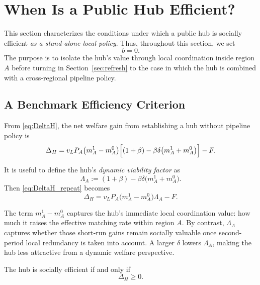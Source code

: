 \section{When Is a Public Hub Efficient?}
\label{sec:hub_efficiency}

This section characterizes the conditions under which a public hub is socially efficient \emph{as a stand-alone local policy}. Thus, throughout this section, we set
\[
b=0.
\]
The purpose is to isolate the hub's value through local coordination inside region $A$ before turning in Section~\ref{sec:refresh} to the case in which the hub is combined with a cross-regional pipeline policy.

\subsection{A Benchmark Efficiency Criterion}

From \eqref{eq:DeltaH}, the net welfare gain from establishing a hub without pipeline policy is
\begin{equation}
\Delta_H
=
v_L P_A \bigl(m_A^1-m_A^0\bigr)
\Bigl[(1+\beta)-\beta\delta\bigl(m_A^1+m_A^0\bigr)\Bigr]
-F.
\label{eq:DeltaH_repeat}
\end{equation}

It is useful to define the hub's \emph{dynamic viability factor} as
\begin{equation}
\Lambda_A
:=
(1+\beta)-\beta\delta\bigl(m_A^1+m_A^0\bigr).
\label{eq:Lambda_def}
\end{equation}
Then \eqref{eq:DeltaH_repeat} becomes
\begin{equation}
\Delta_H
=
v_L P_A \bigl(m_A^1-m_A^0\bigr)\Lambda_A - F.
\label{eq:DeltaH_Lambda}
\end{equation}

The term $m_A^1-m_A^0$ captures the hub's immediate local coordination value: how much it raises the effective matching rate within region $A$. By contrast, $\Lambda_A$ captures whether those short-run gains remain socially valuable once second-period local redundancy is taken into account. A larger $\delta$ lowers $\Lambda_A$, making the hub less attractive from a dynamic welfare perspective.

The hub is socially efficient if and only if
\[
\Delta_H \ge 0.
\]

